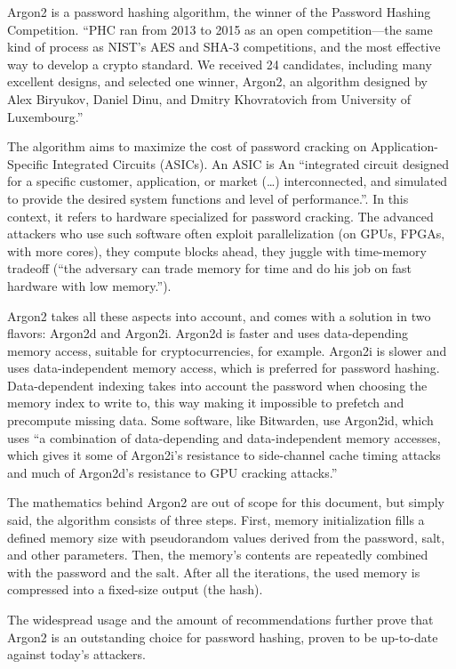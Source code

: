Argon2\cite{argon2} is a password hashing algorithm, the winner of the Password Hashing Competition.
``PHC ran from 2013 to 2015 as an open competition—the same kind of process as NIST's AES and SHA-3 competitions, and the most effective way to develop a crypto standard.
We received 24 candidates, including many excellent designs, and selected one winner, Argon2, an algorithm designed by Alex Biryukov, Daniel Dinu, and Dmitry Khovratovich from University of Luxembourg.''\cite{password-hashing-competition}

The algorithm aims to maximize the cost of password cracking on Application-Specific Integrated Circuits (ASICs).
An ASIC is An ``integrated circuit designed for a specific customer, application, or market (\dots) interconnected, and simulated to provide the desired system functions and level of performance.''\cite{analog_dialogue_1990}.
In this context, it refers to hardware specialized for password cracking.
The advanced attackers who use such software often exploit parallelization (on GPUs, FPGAs, with more cores), they compute blocks ahead, they juggle with time-memory tradeoff (``the adversary can trade memory for time and do his job on fast hardware with low memory.''\cite{argon2}).

Argon2 takes all these aspects into account, and comes with a solution in two flavors: Argon2d and Argon2i.
Argon2d is faster and uses data-depending memory access, suitable for cryptocurrencies, for example.
Argon2i is slower and uses data-independent memory access, which is preferred for password hashing.
Data-dependent indexing takes into account the password when choosing the memory index to write to, this way making it impossible to prefetch and precompute missing data.
Some software, like Bitwarden, use Argon2id, which uses ``a combination of data-depending and data-independent memory accesses, which gives it some of Argon2i's resistance to side-channel cache timing attacks and much of Argon2d's resistance to GPU cracking attacks.''\cite{argon2id}

The mathematics behind Argon2 are out of scope for this document, but simply said, the algorithm consists of three steps.
First, memory initialization fills a defined memory size with pseudorandom values derived from the password, salt, and other parameters.
Then, the memory's contents are repeatedly combined with the password and the salt.
After all the iterations, the used memory is compressed into a fixed-size output (the hash)\cite{argon2}.

The widespread usage and the amount of recommendations further prove that Argon2 is an outstanding choice for password hashing, proven to be up-to-date against today's attackers.




